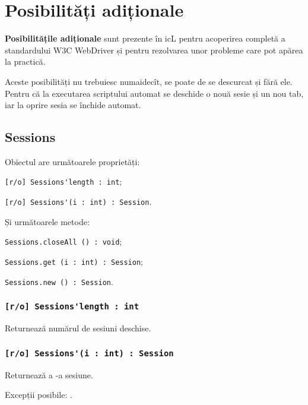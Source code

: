 

\section{Posibilități adiționale}

{\bf Posibilitățile adiționale} sunt prezente în icL pentru acoperirea completă a standardului W3C WebDriver și pentru rezolvarea unor probleme care pot apărea la practică.

Aceste posibilități nu trebuiesc numaidecît, se poate de se descurcat și fără ele. Pentru că la executarea scriptului automat se deschide o nouă sesie și un nou tab, iar la oprire sesia se închide automat.

\subsection{{\color{orange} Sessions}}

Obiectul \sessions{} are următoarele proprietăți:
\begin{icItems}
	\item \lstinline|[r/o] Sessions'length : int|;
	\item \lstinline|[r/o] Sessions'(i : int) : Session|.
\end{icItems}

Și următoarele metode:
\begin{icItems}
	\item \lstinline|Sessions.closeAll () : void|;
	\item \lstinline|Sessions.get (i : int) : Session|;
	\item \lstinline|Sessions.new () : Session|.
\end{icItems}

\subsubsection{\lstinline|[r/o] Sessions'length : int|}

Returnează numărul de sesiuni deschise.

\subsubsection{\lstinline|[r/o] Sessions'(i : int) : Session|}

Returnează a -a sesiune.

Excepții posibile: .

